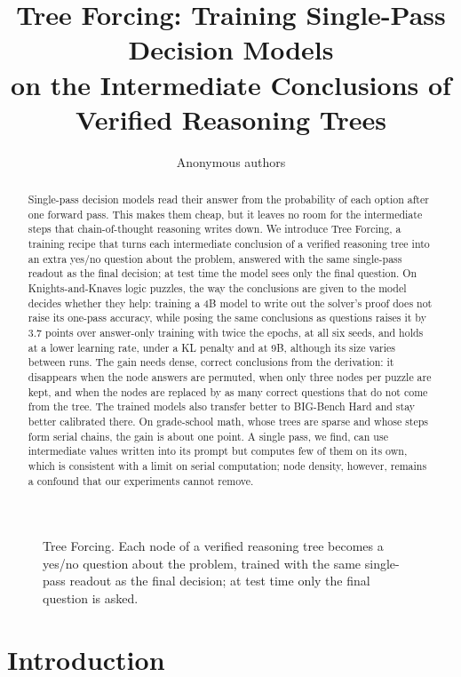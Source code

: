 \documentclass[10pt]{article}
\title{Tree Forcing: Training Single-Pass Decision Models\\on the Intermediate Conclusions of Verified Reasoning Trees}
\author{Anonymous authors}
\newcommand{\tf}{Tree Forcing}
\begin{document}
\maketitle

\begin{abstract}
Single-pass decision models read their answer from the probability of each option after one forward pass. This makes
them cheap, but it leaves no room for the intermediate steps that chain-of-thought reasoning writes down. We introduce
\tf{}, a training recipe that turns each intermediate conclusion of a verified reasoning tree into an extra yes/no
question about the problem, answered with the same single-pass readout as the final decision; at test time the model
sees only the final question. On Knights-and-Knaves logic puzzles, the way the conclusions are given to the model
decides whether they help: training a 4B model to write out the solver's proof does not raise its one-pass accuracy,
while posing the same conclusions as questions raises it by 3.7 points over answer-only training with twice the
epochs, at all six seeds, and holds at a lower learning rate, under a KL penalty and at 9B, although its size varies
between runs. The gain needs dense, correct conclusions from the derivation: it disappears when the node answers are
permuted, when only three nodes per puzzle are kept, and when the nodes are replaced by as many correct questions that
do not come from the tree. The trained models also transfer better to BIG-Bench Hard and stay better calibrated there.
On grade-school math, whose trees are sparse and whose steps form serial chains, the gain is about one point. A single
pass, we find, can use intermediate values written into its prompt but computes few of them on its own, which is
consistent with a limit on serial computation; node density, however, remains a confound that our experiments cannot
remove.
\end{abstract}

\begin{figure}[h]
\centering
\resizebox{\linewidth}{!}{}
\caption{\tf{}. Each node of a verified reasoning tree becomes a yes/no question about the problem, trained with the
same single-pass readout as the final decision; at test time only the final question is asked.}
\label{fig:overview}
\end{figure}

\section{Introduction}
\label{sec:intro}
\end{document}
